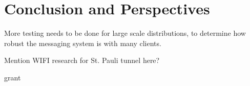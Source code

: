 \section{Conclusion and Perspectives}

More testing needs to be done for large scale distributions, to determine how robust the messaging system is with many clients.

Mention WIFI research for St. Pauli tunnel here?





\begin{acknowledgments}

\innovativ grant


\end{acknowledgments} 

\balance







